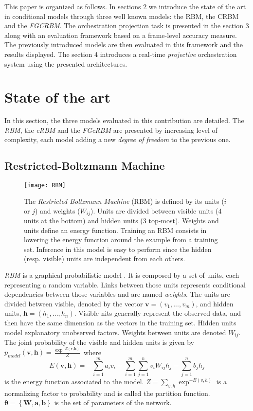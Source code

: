 \documentclass[letterpaper]{article}
\begin{document}
This paper is organized as follows. In sections 2 we introduce the state of the art in conditional models through three well known models: the RBM, the CRBM and the \textit{FGCRBM}. The orchestration projection task is presented in the section 3 along with an evaluation framework based on a frame-level accuracy measure. The previously introduced models are then evaluated in this framework and the results displayed. The section 4 introduces a real-time \textit{projective} orchestration system using the presented architectures.

\section{State of the art}
\label{sec:state_of_the_art}
In this section, the three models evaluated in this contribution are detailed. The \textit{RBM}, the \textit{cRBM} and the \textit{FGcRBM} are presented by increasing level of complexity, each model adding a new \textit{degree of freedom} to the previous one.

\subsection{Restricted-Boltzmann Machine}
\begin{figure}
\centering
\texttt{[image: RBM]}
\caption{The \textit{Restricted Boltzmann Machine} (RBM) is defined by its units ($i$ or $j$) and weights ($W_{ij}$). Units are divided between visible units (4 units at the bottom) and hidden units (3 top-most). Weights and units define an energy function. Training an RBM consists in lowering the energy function around the example from a training set. Inference in this model is easy to perform since the hidden (resp. visible) units are independent from each others.}
\label{fig:RBM}
\end{figure}
\textit{RBM} \cite{Hinton:2006:FLA:1161603.1161605} is a graphical probabilistic model . It is composed by a set of units, each representing a random variable. Links between those units represents conditional dependencies between those variables and are named \textit{weights}. The units are divided between visible, denoted by the vector $\bm{v} = (v_{1},...,v_{m})$, and hidden units, $\bm{h} = (h_{1},...,h_{n})$. Visible nits generally represent the observed data, and then have the same dimension as the vectors in the training set. Hidden units model explanatory unobserved factors.
Weights between units are denoted $W_{ij}$. The joint probability of the visible and hidden units is given by $p_{model}(\bm{v},\bm{h}) = \frac{\exp^{-E(\bm{v},\bm{h})}}{Z}$ where
\begin{equation}
E(\bm{v},\bm{h}) = - \sum_{i=1}^{m} a_{i} v_{i}  - \sum_{i=1}^{m} \sum_{j=1}^{n} v_{i} W_{ij} h_{j} - \sum_{j = 1}^{n} b_{j} h_{j}
\end{equation}
is the energy function associated to the model. $Z = \sum_{v,h}\exp^{-E(v,h)}$ is a normalizing factor to probability and is called the partition function. $\bm{\theta} = \left\lbrace \bm{W} , \bm{a} , \bm{b} \right\rbrace$ is the set of parameters of the network.
\end{document}

